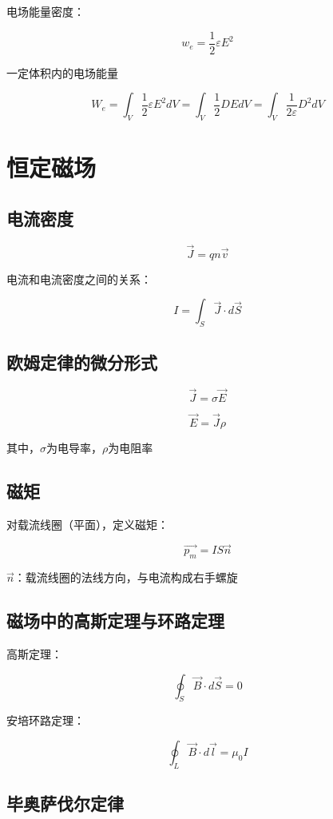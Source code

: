 \documentclass{ctexart}
\begin{document}
电场能量密度：

$$w_e=\frac{1}{2}\varepsilon E^2$$

一定体积内的电场能量

$$W_e=\int_V \frac{1}{2}\varepsilon E^2dV
=\int_V \frac{1}{2}DEdV=\int_V \frac{1}{2\varepsilon} D^2dV$$

\section{恒定磁场}

\subsection{电流密度}

$$\vec{J}=qn\vec{v}$$

电流和电流密度之间的关系：

$$I=\int_{S}\vec{J}\cdot d\vec{S}$$

\subsection{欧姆定律的微分形式}

$$\vec{J}=\sigma \vec{E}$$

$$\vec{E}=\vec{J}\rho $$

其中，$\sigma$为电导率，$\rho$为电阻率

\subsection{磁矩}

对载流线圈（平面），定义磁矩：

$$\vec{p_m}=IS\vec{n}$$

$\vec{n}$：载流线圈的法线方向，与电流构成右手螺旋

\subsection{磁场中的高斯定理与环路定理}

高斯定理：

$$\oint_{S}\vec{B}\cdot d\vec{S}=0$$

安培环路定理：

$$\oint_{L}\vec{B}\cdot d\vec{l}=\mu_0 I$$

\subsection{毕奥萨伐尔定律}
\end{document}
